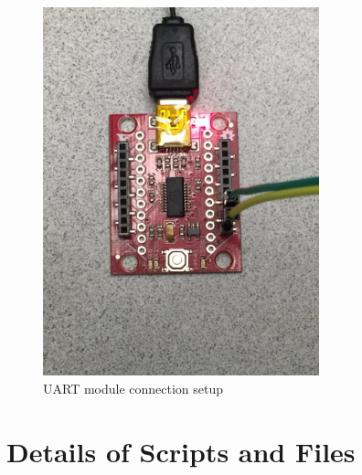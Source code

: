 \documentclass{article}
\theoremstyle{definition}
\begin{document}
\begin{figure}[h]
\caption{UART module connection setup}
\label{uart}
\includegraphics[width=8cm]{./fig/UART.jpg}
\centering
\end{figure}

\clearpage






\section{Details of Scripts and Files}
\end{document}
